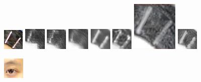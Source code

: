 \documentclass[10pt,twocolumn,letterpaper]{article}
\begin{document}
\begin{figure}[t]
\begin{minipage}[t]{1\linewidth}
\centering
\includegraphics[width=0.11\linewidth]{img/page1_example/hairpin_photo_patch.png}
\includegraphics[width=0.11\linewidth]{img/page1_example/hairpin_mrf_patch.png}
\includegraphics[width=0.11\linewidth]{img/page1_example/hairpin_wmrf_patch.png}
\includegraphics[width=0.11\linewidth]{img/page1_example/hairpin_ssd_patch.png}
\includegraphics[width=0.11\linewidth]{img/page1_example/hairpin_fcnn_patch.png}
\includegraphics[width=0.11\linewidth]{img/page1_example/hairpin_bfcn_patch.png}
\includegraphics[width=0.11\linewidth]{img/page1_example/hairpin_deepart_patch.jpg}
\includegraphics[width=0.11\linewidth]{img/page1_example/hairpin_ours_patch.png}
\end{minipage}
\begin{minipage}[t]{1\linewidth}
\centering
\includegraphics[width=0.11\linewidth]{img/page1_example/eye_photo.png}

\end{minipage}
\end{figure}
\end{document}

